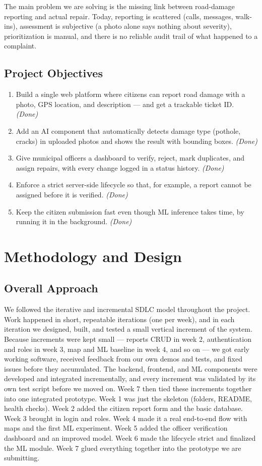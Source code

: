 \documentclass{tietreport}
\begin{document}
The main problem we are solving is the missing link between road-damage reporting and actual repair. Today, reporting is scattered (calls, messages, walk-ins), assessment is subjective (a photo alone says nothing about severity), prioritization is manual, and there is no reliable audit trail of what happened to a complaint.


\clearpage
\section{Project Objectives}

\begin{enumerate}
  \item Build a single web platform where citizens can report road damage with a photo, GPS location, and description --- and get a trackable ticket ID. \emph{(Done)}
  \item Add an AI component that automatically detects damage type (pothole, cracks) in uploaded photos and shows the result with bounding boxes. \emph{(Done)}
  \item Give municipal officers a dashboard to verify, reject, mark duplicates, and assign repairs, with every change logged in a status history. \emph{(Done)}
  \item Enforce a strict server-side lifecycle so that, for example, a report cannot be assigned before it is verified. \emph{(Done)}
  \item Keep the citizen submission fast even though ML inference takes time, by running it in the background. \emph{(Done)}
\end{enumerate}

\chapter{Methodology and Design}


\section{Overall Approach}

We followed the iterative and incremental SDLC model throughout the project. Work happened in short, repeatable iterations (one per week), and in each iteration we designed, built, and tested a small vertical increment of the system. Because increments were kept small --- reports CRUD in week 2, authentication and roles in week 3, map and ML baseline in week 4, and so on --- we got early working software, received feedback from our own demos and tests, and fixed issues before they accumulated. The backend, frontend, and ML components were developed and integrated incrementally, and every increment was validated by its own test script before we moved on. Week 7 then tied these increments together into one integrated prototype. Week 1 was just the skeleton (folders, README, health checks). Week 2 added the citizen report form and the basic database. Week 3 brought in login and roles. Week 4 made it a real end-to-end flow with maps and the first ML experiment. Week 5 added the officer verification dashboard and an improved model. Week 6 made the lifecycle strict and finalized the ML module. Week 7 glued everything together into the prototype we are submitting.
\end{document}
